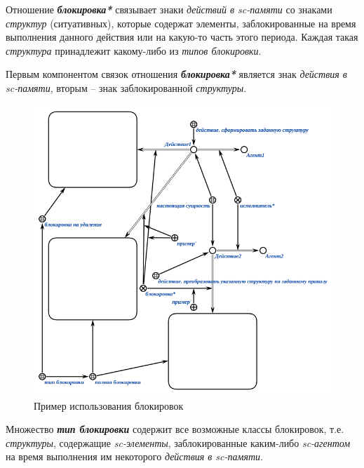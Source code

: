 Отношение \textbf{\textit{блокировка*}} связывает знаки \textit{действий в sc-памяти} со знаками \textit{структур} (ситуативных), которые содержат элементы, заблокированные на время выполнения данного действия или на какую-то часть этого периода. Каждая такая \textit{структура} принадлежит какому-либо из \textit{типов блокировки}.

Первым компонентом связок отношения \textbf{\textit{блокировка*}} является знак \textit{действия в sc-памяти}, вторым – знак заблокированной \textit{структуры}.

\begin{SCn}	

\end{SCn}	

\begin{figure}[h]
	\centering
	\includegraphics[scale=0.8]{images/part3/chapter_situation_management/lock.png}
	\caption{Пример использования блокировок}
	\label{fig:lock}
\end{figure}

Множество \textbf{\textit{тип блокировки}} содержит все возможные классы блокировок, т.е. \textit{структуры}, содержащие \textit{sc-элементы}, заблокированные каким-либо \textit{sc-агентом} на время выполнения им некоторого \textit{действия в sc-памяти}.

